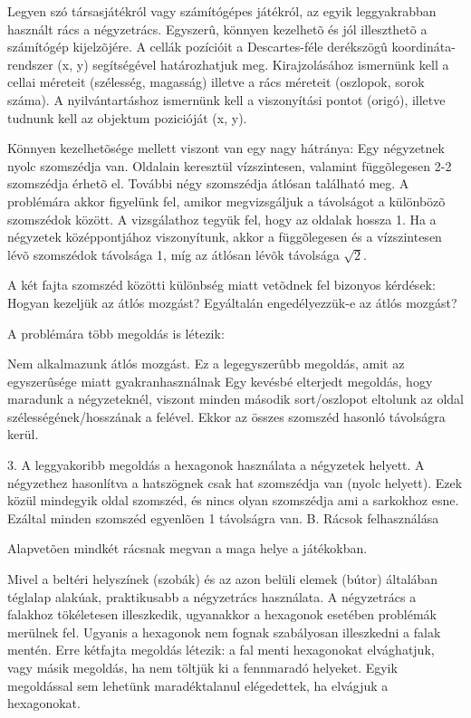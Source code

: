 
Legyen szó társasjátékról vagy számítógépes játékról, az egyik leggyakrabban használt rács a négyzetrács. Egyszerû, könnyen kezelhetõ és jól illeszthetõ a számítógép kijelzõjére. A cellák pozícióit a Descartes-féle derékszögû koordináta-rendszer (x, y) segítségével határozhatjuk meg. Kirajzolásához ismernünk kell a cellai méreteit (szélesség, magasság) illetve a rács méreteit (oszlopok, sorok száma). A nyilvántartáshoz ismernünk kell a viszonyítási pontot (origó), illetve tudnunk kell az objektum pozicióját (x, y).

Könnyen kezelhetõsége mellett viszont van egy nagy hátránya:
Egy négyzetnek nyolc szomszédja van. Oldalain keresztül vízszintesen, valamint függõlegesen 2-2 szomszédja érhetõ el. További négy szomszédja átlósan található meg. A problémára akkor figyelünk fel, amikor megvizsgáljuk a távolságot a különbözõ szomszédok között. A vizsgálathoz tegyük fel, hogy az oldalak hossza 1. Ha a négyzetek középpontjához viszonyítunk, akkor a függõlegesen és a vízszintesen lévõ szomszédok távolsága 1, míg az átlósan lévõk távolsága $\sqrt{2}$.

A két fajta szomszéd közötti különbség miatt vetõdnek fel bizonyos kérdések:
Hogyan kezeljük az átlós mozgást? 
Egyáltalán engedélyezzük-e az átlós mozgást? 

A problémára több megoldás is létezik:

Nem alkalmazunk átlós mozgást. Ez a legegyszerûbb megoldás, amit az egyszerûsége miatt gyakranhasználnak
Egy kevésbé elterjedt megoldás, hogy maradunk a négyzeteknél, viszont minden második sort/oszlopot eltolunk az oldal szélességének/hosszának a felével. Ekkor az összes szomszéd hasonló távolságra kerül.

3. A leggyakoribb megoldás a hexagonok használata a négyzetek helyett. A négyzethez hasonlítva a hatszögnek csak hat szomszédja van (nyolc helyett). Ezek közül mindegyik oldal szomszéd, és nincs olyan szomszédja ami a sarkokhoz esne. Ezáltal minden szomszéd egyenlõen 1 távolságra van.
B. Rácsok felhasználása

Alapvetõen mindkét rácsnak megvan a maga helye a játékokban. 

Mivel a beltéri helyszínek (szobák) és az azon belüli elemek (bútor) általában téglalap alakúak, praktikusabb a négyzetrács használata. A négyzetrács a falakhoz tökéletesen illeszkedik, ugyanakkor a hexagonok esetében problémák merülnek fel. Ugyanis a hexagonok nem fognak szabályosan illeszkedni a falak mentén. Erre kétfajta megoldás létezik: a fal menti hexagonokat elvághatjuk, vagy másik megoldás, ha nem töltjük ki a fennmaradó helyeket. Egyik megoldással sem lehetünk maradéktalanul elégedettek,
ha elvágjuk a hexagonokat. 

